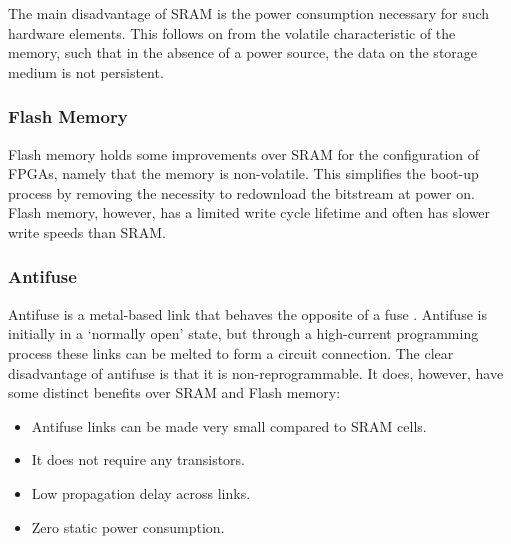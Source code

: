 The main disadvantage of \gls{SRAM} is the power consumption necessary for such
hardware elements. This follows on from the volatile characteristic of the
memory, such that in the absence of a power source, the data on the storage
medium is not persistent.

\subsubsection{Flash Memory}
\label{fpga:configuration:flash}
Flash memory holds some improvements over \gls{SRAM} for the configuration of
\glspl{FPGA}, namely that the memory is non-volatile. This simplifies the
boot-up process by removing the necessity to redownload the bitstream at power
on. Flash memory, however, has a limited write cycle lifetime and often has
slower write speeds than \gls{SRAM}.

\subsubsection{Antifuse}
\label{fpga:configuration:antifuse}
Antifuse is a metal-based link that behaves the opposite of a fuse
\cite{Hauck:2007}. Antifuse is initially in a `normally open' state, but through
a high-current programming process these links can be melted to form a circuit
connection. The clear disadvantage of antifuse is that it is non-reprogrammable.
It does, however, have some distinct benefits over \gls{SRAM} and Flash memory:
\begin{itemize}
    \item Antifuse links can be made very small compared to \gls{SRAM} cells.
    \item It does not require any transistors.
    \item Low propagation delay across links.
    \item Zero static power consumption.
\end{itemize}